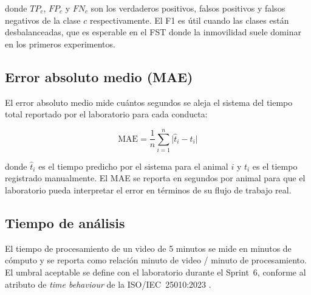 donde $TP_c$, $FP_c$ y $FN_c$ son los verdaderos positivos, falsos positivos y falsos
negativos de la clase $c$ respectivamente. El F1 es útil cuando las clases están
desbalanceadas, que es esperable en el FST donde la inmovilidad suele dominar en los
primeros experimentos.

\subsection{Error absoluto medio (MAE)}

El error absoluto medio mide cuántos segundos se aleja el sistema del tiempo total
reportado por el laboratorio para cada conducta:

\begin{equation}
    \text{MAE} = \frac{1}{n} \sum_{i=1}^{n} \bigl| \hat{t}_i - t_i \bigr|
    \label{eq:mae}
\end{equation}

donde $\hat{t}_i$ es el tiempo predicho por el sistema para el animal $i$ y $t_i$ es el
tiempo registrado manualmente. El MAE se reporta en segundos por animal para que el
laboratorio pueda interpretar el error en términos de su flujo de trabajo real.

\subsection{Tiempo de análisis}

El tiempo de procesamiento de un video de 5 minutos se mide en minutos de cómputo y
se reporta como relación minuto de video / minuto de procesamiento. El umbral
aceptable se define con el laboratorio durante el Sprint~6, conforme al atributo de
\textit{time behaviour} de la ISO/IEC~25010:2023 \cite{iso25010}.
